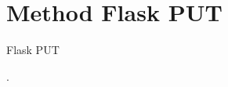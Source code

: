 \documentclass{wileySix}
\begin{document}
%



%


%

%

\chapter{Method Flask PUT}
{Flask PUT}







.

\printindex
\end{document}

